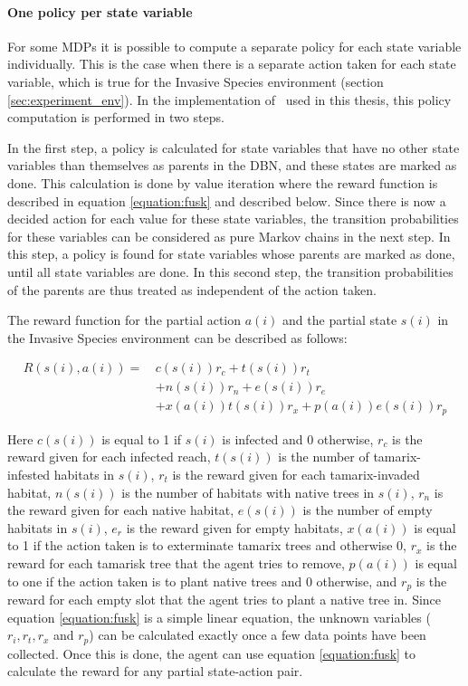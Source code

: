 \paragraph{One policy per state variable}
\label{sec:one_policy_per_state_variable}

For some MDPs it is possible to compute a separate policy for each state
variable individually. This is the case when there is a separate action taken
for each state variable, which is true for the Invasive Species environment
(section \ref{sec:experiment_env}). In the implementation of \etre\ used in
this thesis, this policy computation is performed in two steps. 

In the first step, a policy is calculated for state variables that have no
other state variables than themselves as parents in the DBN, and these states
are marked as done. This calculation is done by value iteration where the reward function
is described in equation \eqref{equation:fusk} and described below. Since there is now a decided action for each value for
these state variables, the transition probabilities for these variables can be
considered as pure Markov chains in the next step. In this step, a policy is
found for state variables whose parents are marked as done, until all state
variables are done.  In this second step, the transition probabilities of the
parents are thus treated as independent of the action taken.

The reward function for the partial action $a(i)$ and the partial state $s(i)$ in the Invasive Species environment can be described as follows:

\begin{align}
\label{equation:fusk}
R(s(i),a(i)) = \, 
 & c(s(i)) r_c + t(s(i)) r_t  \nonumber \\
 & + n(s(i)) r_n + e(s(i)) r_e   \nonumber \\
 & +  x(a(i)) t(s(i)) r_x + p(a(i)) e(s(i)) r_p
\end{align}

Here $c(s(i))$ is equal to 1 if $s(i)$ is infected and 0 otherwise, $r_c$ is the reward given for each infected reach, $t(s(i))$ is the number of tamarix-infested habitats in $s(i)$, $r_t$ is the reward given for each tamarix-invaded habitat, $n(s(i))$ is the number of habitats with native trees in $s(i)$, $r_n$ is the reward given for each native habitat, $e(s(i))$ is the number of empty habitats in $s(i)$, $e_r$ is the reward given for empty habitats, $x(a(i))$ is equal to 1 if the action taken is to exterminate tamarix trees and otherwise 0, $r_x$ is the reward for each tamarisk tree that the agent tries to remove, $p(a(i))$ is equal to one if the action taken is to plant native trees and 0 otherwise, and $r_p$ is the reward for each empty slot that the agent tries to plant a native tree in. 
Since equation \eqref{equation:fusk} is a simple linear equation, the unknown variables ($r_i, r_t, r_x$ and $r_p$) can be calculated exactly once a few data points have been collected. Once this is done, the agent can use equation \eqref{equation:fusk} to calculate the reward for any partial state-action pair. 

